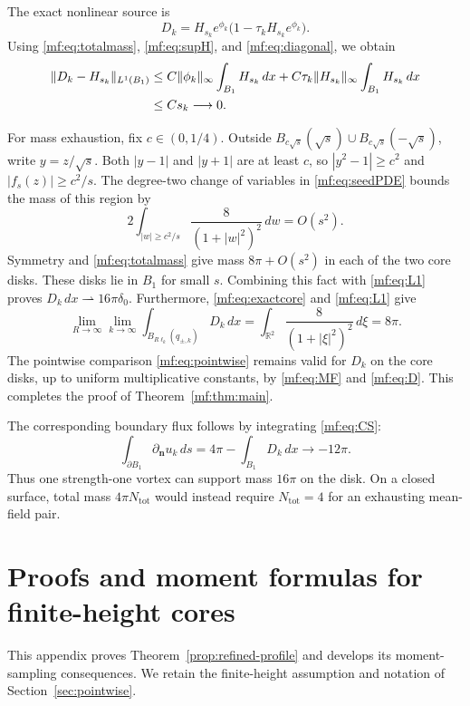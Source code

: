 \documentclass[11pt,reqno]{amsart}
\numberwithin{equation}{section}
\theoremstyle{definition}
\theoremstyle{remark}
\newcommand{\R}{\mathbb R}
\newcommand{\dd}{\,dx}
\begin{document}
The exact nonlinear source is
\begin{equation}\label{mf:eq:D}
D_k=H_{s_k}e^{\phi_k}
\bigl(1-\tau_kH_{s_k}e^{\phi_k}\bigr).
\end{equation}
Using \eqref{mf:eq:totalmass}, \eqref{mf:eq:supH}, and \eqref{mf:eq:diagonal},
we obtain
\begin{align}\label{mf:eq:L1}
\|D_k-H_{s_k}\|_{L^1(B_1)}
&\le C\|\phi_k\|_\infty\int_{B_1}H_{s_k}\dd
 +C\tau_k\|H_{s_k}\|_\infty\int_{B_1}H_{s_k}\dd\notag\\
&\le Cs_k\longrightarrow0.
\end{align}

For mass exhaustion, fix $c\in(0,1/4)$. Outside
$B_{c\sqrt{s}}(\sqrt{s})\cup B_{c\sqrt{s}}(-\sqrt{s})$, write
$y=z/\sqrt{s}$. Both $|y-1|$ and $|y+1|$ are at least $c$, so
$|y^2-1|\ge c^2$ and $|f_s(z)|\ge c^2/s$. The degree-two
change of variables in \eqref{mf:eq:seedPDE} bounds the mass of this
region by
\[
2\int_{|w|\ge c^2/s}\frac8{(1+|w|^2)^2}\,dw=O(s^2).
\]
Symmetry and \eqref{mf:eq:totalmass} give mass $8\pi+O(s^2)$ in
each of the two core disks. These disks lie in $B_1$ for small $s$.
Combining this fact with \eqref{mf:eq:L1} proves
\(D_k\dd\rightharpoonup16\pi\delta_0.\)
Furthermore, \eqref{mf:eq:exactcore} and \eqref{mf:eq:L1} give
\[
\lim_{R\to\infty}\lim_{k\to\infty}
\int_{B_{R\ell_k}(q_{\pm,k})}D_k\dd
=\int_{\R^2}\frac8{(1+|\xi|^2)^2}\,d\xi=8\pi.
\]
The pointwise comparison \eqref{mf:eq:pointwise} remains valid for
$D_k$ on the core disks, up to uniform multiplicative constants,
by \eqref{mf:eq:MF} and \eqref{mf:eq:D}. This completes the proof of
Theorem~\ref{mf:thm:main}.

The corresponding boundary flux follows by integrating \eqref{mf:eq:CS}:
\begin{equation}\label{mf:eq:flux}
\int_{\partial B_1}\partial_{\boldsymbol n}u_k\,ds
=4\pi-\int_{B_1}D_k\dd\longrightarrow-12\pi.
\end{equation}
Thus one strength-one vortex can support mass $16\pi$ on the disk.
On a closed surface, total mass $4\pi N_{\mathrm{tot}}$ would instead
require $N_{\mathrm{tot}}=4$ for an exhausting mean-field pair.
 

\appendix
\section{Proofs and moment formulas for finite-height cores}
\label{app:pointwise-proofs}

This appendix proves Theorem~\ref{prop:refined-profile} and develops
its moment-sampling consequences. We retain the finite-height
assumption and notation of Section~\ref{sec:pointwise}.
\end{document}
